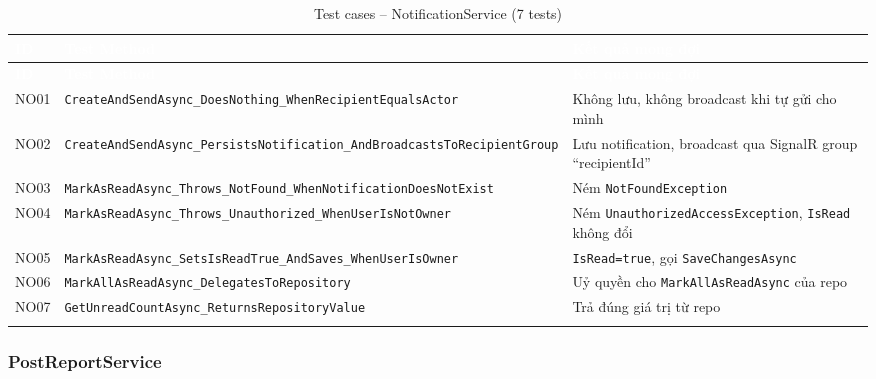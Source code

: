 \documentclass[a4paper]{article}
\begin{document}
\begin{longtable}{|C{0.8cm}|L{5.4cm}|L{7.4cm}|}
\hline
{}
\textcolor{white}{\textbf{ID}} &
\textcolor{white}{\textbf{Test Method}} &
\textcolor{white}{\textbf{Kết quả mong đợi}} \\
\hline
\endfirsthead
\hline
{}
\textcolor{white}{\textbf{ID}} &
\textcolor{white}{\textbf{Test Method}} &
\textcolor{white}{\textbf{Kết quả mong đợi}} \\
\hline
\endhead
\hline
\endfoot

NO01 & \texttt{CreateAndSendAsync\_DoesNothing\_WhenRecipientEqualsActor} & Không lưu, không broadcast khi tự gửi cho mình \\
\hline
NO02 & \texttt{CreateAndSendAsync\_PersistsNotification\_AndBroadcastsToRecipientGroup} & Lưu notification, broadcast qua SignalR group ``recipientId'' \\
\hline
{}
NO03 & \texttt{MarkAsReadAsync\_Throws\_NotFound\_WhenNotificationDoesNotExist} & Ném \texttt{NotFoundException} \\
\hline
NO04 & \texttt{MarkAsReadAsync\_Throws\_Unauthorized\_WhenUserIsNotOwner} & Ném \texttt{UnauthorizedAccessException}, \texttt{IsRead} không đổi \\
\hline
{}
NO05 & \texttt{MarkAsReadAsync\_SetsIsReadTrue\_AndSaves\_WhenUserIsOwner} & \texttt{IsRead=true}, gọi \texttt{SaveChangesAsync} \\
\hline
NO06 & \texttt{MarkAllAsReadAsync\_DelegatesToRepository} & Uỷ quyền cho \texttt{MarkAllAsReadAsync} của repo \\
\hline
{}
NO07 & \texttt{GetUnreadCountAsync\_ReturnsRepositoryValue} & Trả đúng giá trị từ repo \\
\hline
\caption{Test cases -- NotificationService (7 tests)}
\end{longtable}

\subsubsection{PostReportService}
\end{document}
